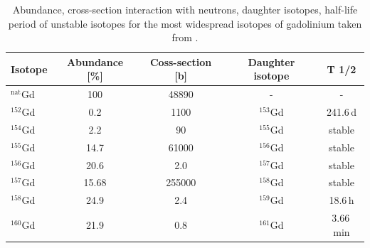 \begin{table}[!h]
\centering
\begin{tabular}{lcccc}  
\toprule
Isotope             & Abundance [\%] & Coss-section [b] & Daughter isotope & T 1/2      \\
\midrule
$^{\textrm{nat}}$Gd & 100            & 48890            & -                & -          \\
$^{152}$Gd          & 0.2            & 1100             & $^{153}$Gd       & 241.6\,d   \\
$^{154}$Gd          & 2.2            & 90               & $^{155}$Gd       & stable     \\
$^{155}$Gd          & 14.7           & 61000            & $^{156}$Gd       & stable     \\
$^{156}$Gd          & 20.6           & 2.0              & $^{157}$Gd       & stable     \\
$^{157}$Gd          & 15.68          & 255000           & $^{158}$Gd       & stable     \\
$^{158}$Gd          & 24.9           & 2.4              & $^{159}$Gd       & 18.6\,h    \\
$^{160}$Gd          & 21.9           & 0.8              & $^{161}$Gd       & 3.66\,min  \\
\bottomrule  
\end{tabular}
\caption{Abundance, cross-section interaction with neutrons, daughter isotopes, half-life period of unstable isotopes for the most widespread isotopes of gadolinium taken from \cite{Abdushukurov_2010}.}
\label{tab:gdTable}
\end{table}

